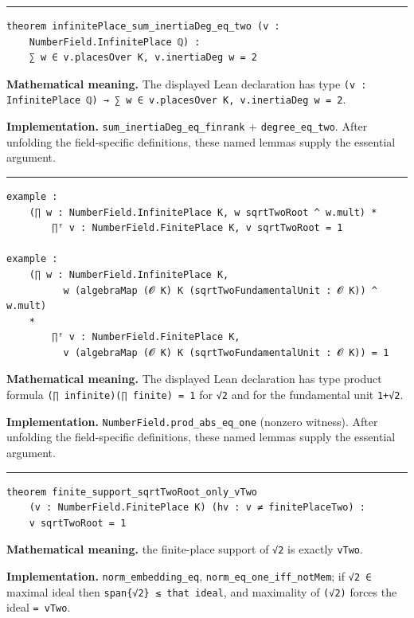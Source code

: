 \documentclass[UTF8,a4paper,11pt,fontset=fandol]{ctexart}
\theoremstyle{definition}
\newcommand{\statementsep}{\par\medskip\hrule\medskip}
\begin{document}
\statementsep
\begin{verbatim}
theorem infinitePlace_sum_inertiaDeg_eq_two (v :
    NumberField.InfinitePlace ℚ) :
    ∑ w ∈ v.placesOver K, v.inertiaDeg w = 2
\end{verbatim}
\noindent\textbf{Mathematical meaning.} The displayed Lean declaration has type \texttt{(v : InfinitePlace ℚ) → ∑ w ∈ v.\allowbreak{}placesOver K, v.\allowbreak{}inertiaDeg w = 2}.\par
\noindent\textbf{Implementation.} \texttt{sum\_\allowbreak{}inertiaDeg\_\allowbreak{}eq\_\allowbreak{}finrank} + \texttt{degree\_\allowbreak{}eq\_\allowbreak{}two}. After unfolding the field-specific definitions, these named lemmas supply the essential argument.\par
\statementsep
\begin{verbatim}
example :
    (∏ w : NumberField.InfinitePlace K, w sqrtTwoRoot ^ w.mult) *
        ∏ᶠ v : NumberField.FinitePlace K, v sqrtTwoRoot = 1

example :
    (∏ w : NumberField.InfinitePlace K,
          w (algebraMap (𝓞 K) K (sqrtTwoFundamentalUnit : 𝓞 K)) ^ w.mult)
    *
        ∏ᶠ v : NumberField.FinitePlace K,
          v (algebraMap (𝓞 K) K (sqrtTwoFundamentalUnit : 𝓞 K)) = 1
\end{verbatim}
\noindent\textbf{Mathematical meaning.} The displayed Lean declaration has type product formula \texttt{(∏ infinite)(∏ finite) = 1} for \texttt{√2} and for the fundamental unit \texttt{1+√2}.\par
\noindent\textbf{Implementation.} \texttt{NumberField.\allowbreak{}prod\_\allowbreak{}abs\_\allowbreak{}eq\_\allowbreak{}one} (nonzero witness). After unfolding the field-specific definitions, these named lemmas supply the essential argument.\par
\statementsep
\begin{verbatim}
theorem finite_support_sqrtTwoRoot_only_vTwo
    (v : NumberField.FinitePlace K) (hv : v ≠ finitePlaceTwo) :
    v sqrtTwoRoot = 1
\end{verbatim}
\noindent\textbf{Mathematical meaning.} the finite-place support of \texttt{√2} is exactly \texttt{vTwo}.\par
\noindent\textbf{Implementation.} \texttt{norm\_\allowbreak{}embedding\_\allowbreak{}eq}, \texttt{norm\_\allowbreak{}eq\_\allowbreak{}one\_\allowbreak{}iff\_\allowbreak{}notMem}; if \texttt{√2 ∈} maximal ideal then \texttt{span\{√2\} ≤ that ideal}, and maximality of \texttt{(√2)} forces the ideal \texttt{= vTwo}.\par
\end{document}
